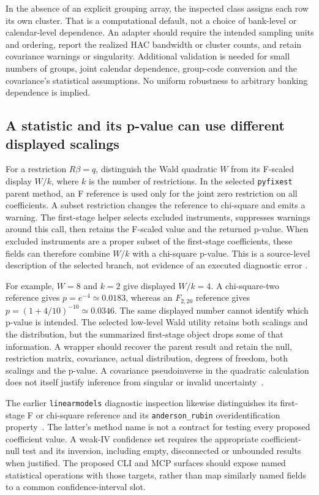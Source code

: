 In the absence of an explicit grouping array, the inspected class assigns
each row its own cluster. That is a computational default, not a choice of
bank-level or calendar-level dependence. An adapter should require the intended
sampling units and ordering, report the realized HAC bandwidth or cluster counts,
and retain covariance warnings or singularity. Additional validation is needed
for small numbers of groups, joint calendar dependence, group-code conversion
and the covariance's statistical assumptions. No uniform robustness to arbitrary
banking dependence is implied.

\subsection{A statistic and its p-value can use different displayed scalings}
\label{exec22:pyiv-diagnostics}

For a restriction $R\beta=q$, distinguish the Wald quadratic $W$ from its
F-scaled display $W/k$, where $k$ is the number of restrictions. In the selected
\texttt{pyfixest} parent method, an F reference is used only for the joint zero
restriction on all coefficients. A subset restriction changes the reference
to chi-square and emits a warning. The first-stage helper selects excluded
instruments, suppresses warnings around this call, then retains the F-scaled
value and the returned p-value. When excluded instruments are a proper subset
of the first-stage coefficients, these fields can therefore combine $W/k$
with a chi-square p-value. This is a source-level description of the selected
branch, not evidence of an executed diagnostic error
\citep{exec22_pyiv_kernels_pyfixest}.

For example, $W=8$ and $k=2$ give displayed $W/k=4$. A chi-square-two reference
gives $p=e^{-4}\simeq0.0183$, whereas an $F_{2,20}$ reference gives
$p=(1+4/10)^{-10}\simeq0.0346$. The same displayed number cannot identify
which p-value is intended. The selected low-level Wald utility retains both
scalings and the distribution, but the summarized first-stage object drops
some of that information. A wrapper should recover the parent result and
retain the null, restriction matrix, covariance, actual distribution, degrees
of freedom, both scalings and the p-value. A covariance pseudoinverse in the
quadratic calculation does not itself justify inference from singular or
invalid uncertainty~\citep{exec22_pyiv_kernels_pyfixest,exec22_pyiv_reference}.

The earlier \texttt{linearmodels} diagnostic inspection likewise distinguishes
its first-stage F or chi-square reference and its \texttt{anderson\_rubin}
overidentification property~\citep{exec22_pyiv_diagnostics_linearmodels}.
The latter's method name is not a contract for
testing every proposed coefficient value. A weak-IV confidence set requires
the appropriate coefficient-null test and its inversion, including empty,
disconnected or unbounded results when justified. The proposed CLI and MCP
surfaces should expose named statistical operations with those targets, rather
than map similarly named fields to a common confidence-interval slot.

